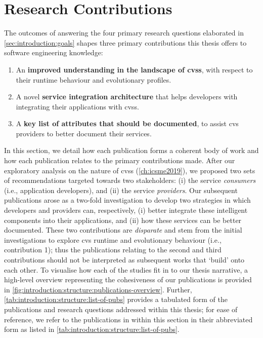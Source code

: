 \section{Research Contributions}
\label{sec:introduction:research-contributions}

The outcomes of answering the four primary research questions elaborated in \cref{sec:introduction:goals} shapes three primary contributions this thesis offers to software engineering knowledge:

\begin{enumerate}
  \item An \textbf{improved understanding in the landscape of \glspl{cvs}}, with respect to their runtime behaviour and evolutionary profiles. 
  \item A novel \textbf{service integration architecture} that helps developers with integrating their applications with \glspl{cvs}.
  \item A \textbf{key list of attributes that should be documented}, to assist \gls{cvs} providers to better document their services.
\end{enumerate}

In this section, we detail how each publication forms a coherent body of work and how each publication relates to the primary contributions made. After our exploratory analysis on the nature of \glspl{cvs} (\cref{ch:icsme2019}), we proposed two sets of recommendations targeted towards two stakeholders: (i) the service \textit{consumers} (i.e., application developers), and (ii) the service \textit{providers}. Our subsequent publications arose as a two-fold investigation to develop two strategies in which developers and providers can, respectively, (i) better integrate these intelligent components into their applications, and (ii) how these services can be better documented. These two contributions are \textit{disparate} and stem from the initial investigations to explore \gls{cvs} runtime and evolutionary behaviour (i.e., contribution 1); thus the publications relating to the second and third contributions should not be interpreted as subsequent works that `build' onto each other. To visualise how each of the studies fit in to our thesis narrative, a high-level overview representing the cohesiveness of our publications is provided in \cref{fig:introduction:structure:publications-overview}. Further, \cref{tab:introduction:structure:list-of-pubs} provides a tabulated form of the publications and research questions addressed within this thesis; for ease of reference, we refer to the publications in within this section in their abbreviated form as listed in \cref{tab:introduction:structure:list-of-pubs}.

